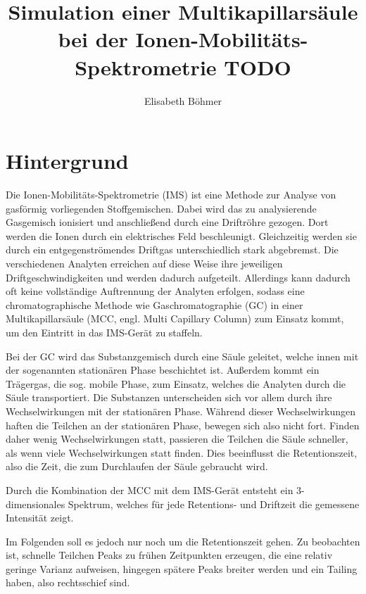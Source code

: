 \documentclass[a4paper,11pt]{article}
\title{Simulation einer Multikapillarsäule bei der Ionen-Mobilitäts-Spektrometrie TODO}
\author{Elisabeth Böhmer}
\begin{document}
\maketitle

\section{Hintergrund}
Die Ionen-Mobilitäts-Spektrometrie (IMS) ist eine Methode zur Analyse von gasförmig vorliegenden Stoffgemischen. 
Dabei wird das zu analysierende Gasgemisch ionisiert und anschließend durch eine Driftröhre gezogen. Dort werden die Ionen durch ein elektrisches Feld beschleunigt. Gleichzeitig werden sie durch ein entgegenströmendes Driftgas unterschiedlich stark abgebremst. Die verschiedenen Analyten erreichen auf diese Weise ihre jeweiligen Driftgeschwindigkeiten und werden dadurch aufgeteilt.
Allerdings kann dadurch oft keine vollständige Auftrennung der Analyten erfolgen, sodass eine chromatographische Methode wie Gaschromatographie (GC) in einer Multikapillarsäule (MCC, engl. Multi Capillary Column) zum Einsatz kommt, um den Eintritt in das IMS-Gerät zu staffeln.

Bei der GC wird das Substanzgemisch durch eine Säule geleitet, welche innen mit der sogenannten stationären Phase beschichtet ist. Außerdem kommt ein Trägergas, die sog. mobile Phase, zum Einsatz, welches die Analyten durch die Säule transportiert. Die Substanzen unterscheiden sich vor allem durch ihre Wechselwirkungen mit der stationären Phase. Während dieser Wechselwirkungen haften die Teilchen an der stationären Phase, bewegen sich also nicht fort. Finden daher wenig Wechselwirkungen statt, passieren die Teilchen die Säule schneller, als wenn viele Wechselwirkungen statt finden. Dies beeinflusst die Retentionszeit, also die Zeit, die zum Durchlaufen der Säule gebraucht wird. 

Durch die Kombination der MCC mit dem IMS-Gerät entsteht ein 3-dimensionales Spektrum, welches für jede Retentions- und Driftzeit die gemessene Intensität zeigt.

Im Folgenden soll es jedoch nur noch um die Retentionszeit gehen.
Zu beobachten ist, schnelle Teilchen Peaks zu frühen Zeitpunkten erzeugen, die eine relativ geringe Varianz aufweisen, hingegen spätere Peaks breiter werden und ein Tailing haben, also rechtsschief sind. %

\end{document}
